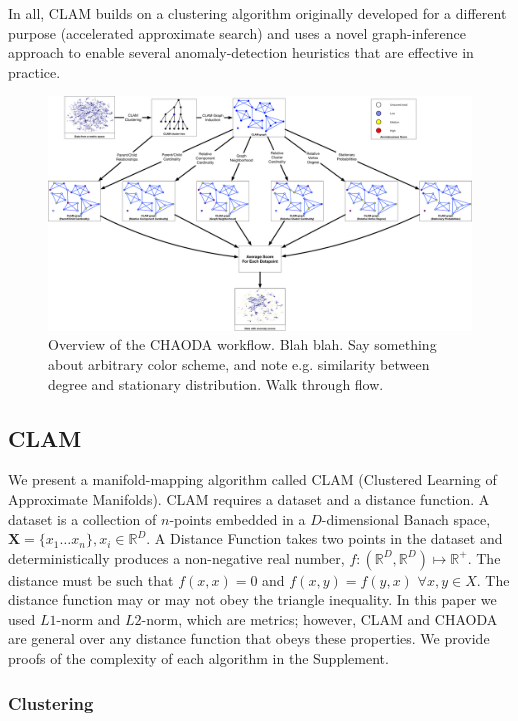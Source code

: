 In all, CLAM builds on a clustering algorithm originally developed for a different purpose (accelerated approximate search) and uses a novel graph-inference approach to enable several anomaly-detection heuristics that are effective in practice.

\begin{figure}[ht!]
    \centering
    \includegraphics[width=6in]{images/chaoda-workflow.pdf}
    \caption{Overview of the CHAODA workflow.
        Blah blah. Say something about arbitrary color scheme, and note e.g. similarity between degree and stationary distribution. Walk through flow.}
    \label{fig:methods:chaoda-workflow}
\end{figure}


\subsection{CLAM}
\label{subsec:methods:clam}

We present a manifold-mapping algorithm called CLAM (Clustered Learning of Approximate Manifolds).
CLAM requires a dataset and a distance function.
A dataset is a collection of $n$-points embedded in a $D$-dimensional Banach space, $\textbf{X} = \{x_1 \dots x_n\}, x_i \in \mathbb{R}^D$.
A Distance Function takes two points in the dataset and deterministically produces a non-negative real number, $f : (\mathbb{R}^D, \mathbb{R}^D) \mapsto \mathbb{R}^+$.
The distance must be such that $f(x, x) = 0$ and $f(x, y) = f(y, x)$ $\forall x, y \in X$.
The distance function may or may not obey the triangle inequality.
In this paper we used $L1$-norm and $L2$-norm, which are metrics;
however, CLAM and CHAODA are general over any distance function that obeys these properties.
We provide proofs of the complexity of each algorithm in the Supplement.


\subsubsection{Clustering}
\label{subsubsec:methods:clam:clustering}

